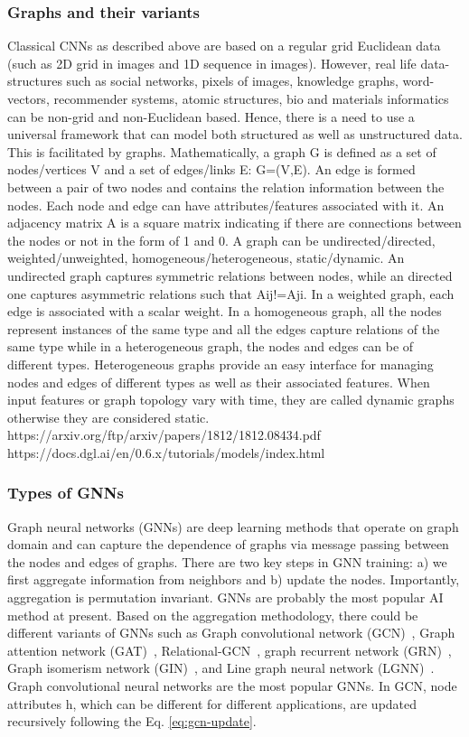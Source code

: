 \documentclass[pdflatex,sn-mathphys]{sn-jnl}%
\theoremstyle{thmstyleone}%
\theoremstyle{thmstyletwo}%
\theoremstyle{thmstylethree}%
\begin{document}
\subsubsection{Graphs and their variants}
Classical CNNs as described above are based on a regular grid Euclidean data (such as 2D grid in images and 1D sequence in images). However, real life data-structures such as social networks, pixels of images,  knowledge graphs, word-vectors, recommender systems, atomic structures, bio and materials informatics can be non-grid and non-Euclidean based. Hence, there is a need to use a universal framework that can model both structured as well as unstructured data. This is facilitated by graphs. 
Mathematically, a graph G is defined as a set of nodes/vertices V and a set of edges/links E: G=(V,E)\cite{west2001introduction,wang2019deep}. An edge is formed between a pair of two nodes and contains the relation information between the nodes. Each node and edge can have attributes/features associated with it. An adjacency matrix A is a square matrix  indicating if there are connections between the nodes or not in the form of 1 and 0. A graph can be undirected/directed, weighted/unweighted, homogeneous/heterogeneous, static/dynamic. An undirected graph captures symmetric relations between nodes, while an directed one captures asymmetric relations such that Aij!=Aji. In a weighted graph, each edge is associated with a scalar weight. In a homogeneous graph, all the nodes represent instances of the same type and all the edges capture relations of the same type while in a heterogeneous graph, the nodes and edges can be of different types. Heterogeneous graphs provide an easy interface for managing nodes and edges of different types as well as their associated features. When input features or graph topology vary with time, they are called dynamic graphs otherwise they are considered static.
https://arxiv.org/ftp/arxiv/papers/1812/1812.08434.pdf
https://docs.dgl.ai/en/0.6.x/tutorials/models/index.html


\subsubsection{Types of GNNs}

Graph neural networks (GNNs) are deep learning methods that operate on graph domain and can capture the dependence of graphs via message passing between the nodes and edges of graphs. There are two key steps in GNN training: a) we first aggregate information from neighbors and b) update the nodes. Importantly, aggregation is permutation invariant. GNNs are probably the most popular AI method at present. Based on the aggregation methodology, there could be different variants of GNNs such as Graph convolutional network (GCN)~\cite{kipf2016semi}, Graph attention network (GAT)~\cite{velivckovic2017graph}, Relational-GCN~\cite{schlichtkrull2017modeling}, graph recurrent network (GRN)~\cite{song-etal-2018-graph}, Graph isomerism network (GIN)~\cite{xu2018powerful}, and Line graph neural network (LGNN)~\cite{chen2017supervised}.
Graph convolutional neural networks are the most popular GNNs. In GCN, node attributes h, which can be different for different applications, are updated recursively following the Eq. \ref{eq:gcn-update}. 
\end{document}
